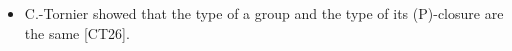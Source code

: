 \documentclass[preview]{standalone}
\begin{document}
\begin{center}
\begin{itemize} \item C.-Tornier showed that the type of a group and the type of its (P)-closure are the same [CT26].\end{itemize}
\end{center}
\end{document}
